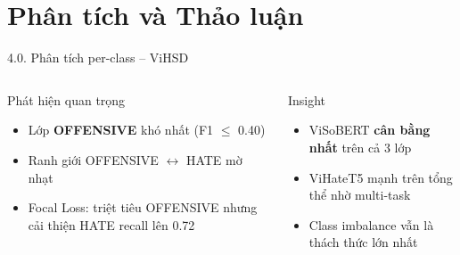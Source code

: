 \documentclass[11pt, aspectratio=169]{beamer}
\begin{document}
\section{Phân tích và Thảo luận}

\begin{frame}[shrink=10]{4.0. Phân tích per-class -- ViHSD}

\begin{table}[h]
  \centering
  \caption{Per-class Precision / Recall / F1 trên ViHSD (nhóm tái lập)}
  \vspace{0.2cm}
\end{table}

\begin{columns}[T]
  \begin{block}{Phát hiện quan trọng}
    \begin{itemize}
      \item Lớp \textbf{OFFENSIVE} khó nhất (F1 $\leq$ 0.40)
      \item Ranh giới OFFENSIVE $\leftrightarrow$ HATE mờ nhạt
      \item Focal Loss: triệt tiêu OFFENSIVE nhưng cải thiện HATE recall lên 0.72
    \end{itemize}
  \end{block}

  \begin{block}{Insight}
    \begin{itemize}
      \item ViSoBERT \textbf{cân bằng nhất} trên cả 3 lớp
      \item ViHateT5 mạnh trên tổng thể nhờ multi-task
      \item Class imbalance vẫn là thách thức lớn nhất
    \end{itemize}
  \end{block}
\end{columns}
\end{frame}
\end{document}
